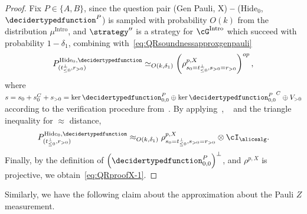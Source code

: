\begin{proof}
	 Fix $P \in \{A,B\}$, since the question pair (Gen Pauli, X) \textbf{--} ($\text{Hide}_0$, $\decidertypedfunction^{P}$) is sampled with probability $O(k)$ from the distribution $\mu^{\text{Intro}}$, and $\strategy''$ is a strategy for $\cG^{\text{Intro}}$ which succeed with probability $1 - \delta_1$, combining with~\eqref{eq:QRsoundnessapproxgenpauli}
	\begin{equation*}
		P^{\text{Hide}_0, \decidertypedfunction}_{(t^{\bot}_{\leq 0}, r_{> 0})} \simeq_{O(k, \delta_1)} \left(\rho^{p, X}_{s_0 = t^{\bot}_{\leq 0}, s_{> 0} =  r_{> 0}} \right)^{op},
	\end{equation*}
	where $s = s_0 + s_0^{C} +s_{> 0} = \ker{\decidertypedfunction^{P}_{0,0}} \oplus \ker{\decidertypedfunction^{P}_{0,0}}^{C} \oplus V_{> 0}$ according to the verification procedure from~. By applying~, ~ and the triangle inequality for $\approx$ distance,
	\begin{equation*}
		P^{\text{Hide}_0, \decidertypedfunction}_{(t^{\bot}_{\leq 0}, r_{> 0})} \approx_{O(k, \delta_1)} \rho^{p, X}_{s_0 = t^{\bot}_{\leq 0}, s_{> 0} =  r_{> 0}} \otimes \cI_{\alicealg}.
	\end{equation*}
	Finally, by the definition of $\left(\decidertypedfunction^P_{0,0}\right)^{\bot}$, and $ \rho^{p, X}$ is projective, we obtain~\eqref{eq:QRproofX-1}.
\end{proof}

Similarly, we have the following claim about the approximation about the Pauli $Z$ measurement. 

